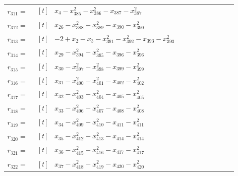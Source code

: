 \begin{longtable}{@{}r p{0.92\linewidth}@{}}
$r_{311}=$ & $\begin{aligned}[t]&x_{4}-x_{385}^{2}-x_{386}^{2}-x_{387}-x_{387}^{2}\end{aligned}$ \\[2pt]
$r_{312}=$ & $\begin{aligned}[t]&x_{26}-x_{388}^{2}-x_{389}^{2}-x_{390}-x_{390}^{2}\end{aligned}$ \\[2pt]
$r_{313}=$ & $\begin{aligned}[t]&-2+x_{2}-x_{3}-x_{391}^{2}-x_{392}^{2}-x_{393}-x_{393}^{2}\end{aligned}$ \\[2pt]
$r_{314}=$ & $\begin{aligned}[t]&x_{29}-x_{394}^{2}-x_{395}^{2}-x_{396}-x_{396}^{2}\end{aligned}$ \\[2pt]
$r_{315}=$ & $\begin{aligned}[t]&x_{30}-x_{397}^{2}-x_{398}^{2}-x_{399}-x_{399}^{2}\end{aligned}$ \\[2pt]
$r_{316}=$ & $\begin{aligned}[t]&x_{31}-x_{400}^{2}-x_{401}^{2}-x_{402}-x_{402}^{2}\end{aligned}$ \\[2pt]
$r_{317}=$ & $\begin{aligned}[t]&x_{32}-x_{403}^{2}-x_{404}^{2}-x_{405}-x_{405}^{2}\end{aligned}$ \\[2pt]
$r_{318}=$ & $\begin{aligned}[t]&x_{33}-x_{406}^{2}-x_{407}^{2}-x_{408}-x_{408}^{2}\end{aligned}$ \\[2pt]
$r_{319}=$ & $\begin{aligned}[t]&x_{34}-x_{409}^{2}-x_{410}^{2}-x_{411}-x_{411}^{2}\end{aligned}$ \\[2pt]
$r_{320}=$ & $\begin{aligned}[t]&x_{35}-x_{412}^{2}-x_{413}^{2}-x_{414}-x_{414}^{2}\end{aligned}$ \\[2pt]
$r_{321}=$ & $\begin{aligned}[t]&x_{36}-x_{415}^{2}-x_{416}^{2}-x_{417}-x_{417}^{2}\end{aligned}$ \\[2pt]
$r_{322}=$ & $\begin{aligned}[t]&x_{37}-x_{418}^{2}-x_{419}^{2}-x_{420}-x_{420}^{2}\end{aligned}$ \\[2pt]

\end{longtable}
